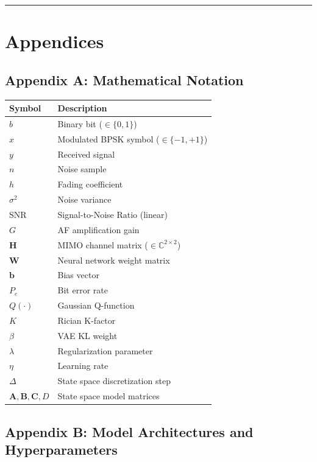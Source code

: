 \documentclass[
  english,
  12pt,
  12pt,
  a4paper,
  oneside]{report}
\newcounter{none} %
\begin{document}
\begin{center}\rule{0.5\linewidth}{0.5pt}\end{center}

\chapter{Appendices}\label{sec:appendices}

\section{Appendix A: Mathematical Notation}\label{sec:appendix-a-mathematical-notation}

{\def\LTcaptype{none} %
\begin{longtable}[]{@{}ll@{}}
\toprule\noalign{}
Symbol & Description \\
\midrule\noalign{}
\endhead
\bottomrule\noalign{}
\endlastfoot
\(b\) & Binary bit (\(\in \{0, 1\}\)) \\
\(x\) & Modulated BPSK symbol (\(\in \{-1, +1\}\)) \\
\(y\) & Received signal \\
\(n\) & Noise sample \\
\(h\) & Fading coefficient \\
\(\sigma^2\) & Noise variance \\
\(\text{SNR}\) & Signal-to-Noise Ratio (linear) \\
\(G\) & AF amplification gain \\
\(\mathbf{H}\) & MIMO channel matrix (\(\in \mathbb{C}^{2 \times 2}\)) \\
\(\mathbf{W}\) & Neural network weight matrix \\
\(\mathbf{b}\) & Bias vector \\
\(P_e\) & Bit error rate \\
\(Q(\cdot)\) & Gaussian Q-function \\
\(K\) & Rician K-factor \\
\(\beta\) & VAE KL weight \\
\(\lambda\) & Regularization parameter \\
\(\eta\) & Learning rate \\
\(\Delta\) & State space discretization step \\
\(\mathbf{A}, \mathbf{B}, \mathbf{C}, D\) & State space model matrices \\
\end{longtable}
}

\section{Appendix B: Model Architectures and Hyperparameters}\label{sec:appendix-b-model-architectures-and-hyperparameters}
\end{document}
